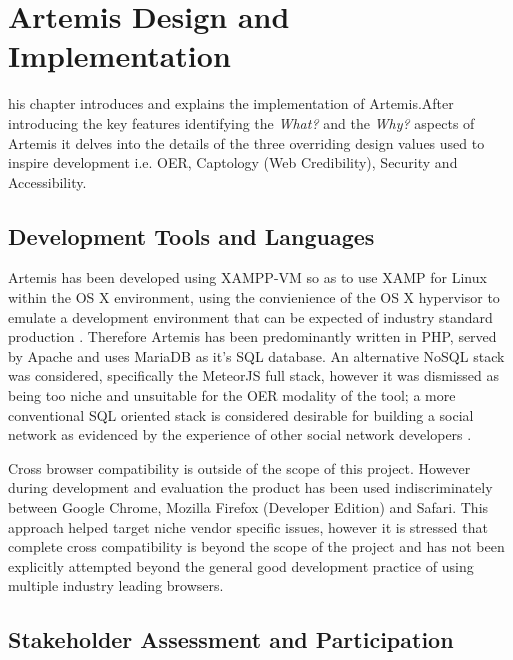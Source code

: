 %
%
\let\textcircled=\pgftextcircled
\chapter{Artemis Design and Implementation}
\label{Artemis Design and Implementation}

his chapter introduces and explains the implementation of Artemis.After introducing the key features identifying the \textit{What?} and the \textit{Why?} aspects of Artemis it delves into the details of the three overriding design values used to inspire development i.e. OER, Captology (Web Credibility), Security and Accessibility.


\section{Development Tools and Languages}

Artemis has been developed using XAMPP-VM so as to use XAMP for Linux within the OS X environment, using the convienience of the OS X hypervisor to emulate a development environment that can be expected of industry standard production \cite{ApacheFriends.org}. Therefore Artemis has been predominantly written in PHP, served by Apache and uses MariaDB as it's SQL database. An alternative NoSQL stack was considered, specifically the MeteorJS full stack, however it was dismissed as being too niche and unsuitable for the OER modality of the tool; a more conventional SQL oriented stack is considered desirable for building a social network as evidenced by the experience of other social network developers \cite{Mei}.

Cross browser compatibility is outside of the scope of this project. However during development and evaluation the product has been used indiscriminately between Google Chrome, Mozilla Firefox (Developer Edition) and Safari. This approach helped target niche vendor specific issues, however it is stressed that complete cross compatibility is beyond the scope of the project and has not been explicitly attempted beyond the general good development practice of using multiple industry leading browsers.







\section{Stakeholder Assessment and Participation}

